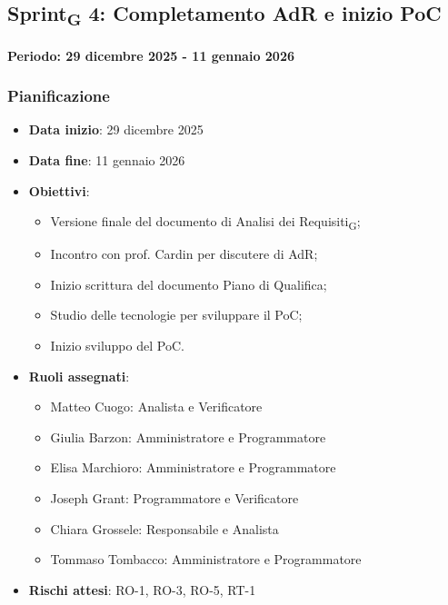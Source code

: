 \documentclass[11pt,a4paper]{article}
\newcommand{\gls}[1]{#1\textsubscript{G}}
\begin{document}
\subsection{\gls{Sprint} 4: Completamento AdR e inizio PoC}
{\textbf{Periodo: 29 dicembre 2025 - 11 gennaio 2026}\par}

\subsubsection{Pianificazione}
\begin{itemize}
    \item \textbf{Data inizio}: 29 dicembre 2025
    \item \textbf{Data fine}: 11 gennaio 2026
    \item \textbf{Obiettivi}:
    \begin{itemize}
        \item Versione finale del documento di \gls{Analisi dei Requisiti};
        \item Incontro con prof. Cardin per discutere di AdR;
        \item Inizio scrittura del documento Piano di Qualifica;
        \item Studio delle tecnologie per sviluppare il PoC;
        \item Inizio sviluppo del PoC.
    \end{itemize}
    \item \textbf{Ruoli assegnati}:
    \begin{itemize}
        \item Matteo Cuogo: Analista e Verificatore 
        \item Giulia Barzon: Amministratore e Programmatore
        \item Elisa Marchioro: Amministratore e Programmatore
        \item Joseph Grant: Programmatore e Verificatore
        \item Chiara Grossele: Responsabile e Analista
        \item Tommaso Tombacco: Amministratore e Programmatore 
    \end{itemize}
    \item \textbf{Rischi attesi}: RO-1, RO-3, RO-5, RT-1
\end{itemize}
\end{document}
